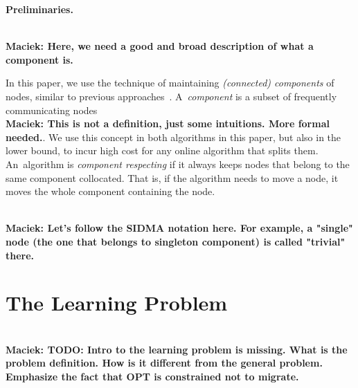 \documentclass[manuscript,screen=true, review, anonymous]{acmart}
\newcommand\maciek[1]{\color{brown}\textbf{\\ Maciek: #1}\color{black}}
\begin{document}

\noindent \textbf{Preliminaries.}

\maciek{Here, we need a good and broad description of what a component is.}

In this paper, we use the technique of maintaining \emph{(connected) components} of nodes, similar to previous approaches~\cite{repartition-disc}. A~\emph{component} is a subset of frequently communicating nodes \maciek{This is not a definition, just some intuitions. More formal needed.}.
We use this concept in both algorithms in this paper, but also in the lower bound, to incur high cost for any online algorithm that splits them.
An~algorithm is \emph{component respecting}
if it always keeps nodes that  belong to the same component collocated.
That is,
if the algorithm needs to move a node,
it moves the whole component containing the node.

\maciek{Let's follow the SIDMA notation here. For example, a "single" node (the one that belongs to singleton component) is called "trivial" there.}


\section{The Learning Problem} %

\maciek{TODO: Intro to the learning problem is missing. What is the problem definition. How is it different from the general problem. Emphasize the fact that OPT is constrained not to migrate.}
\end{document}
